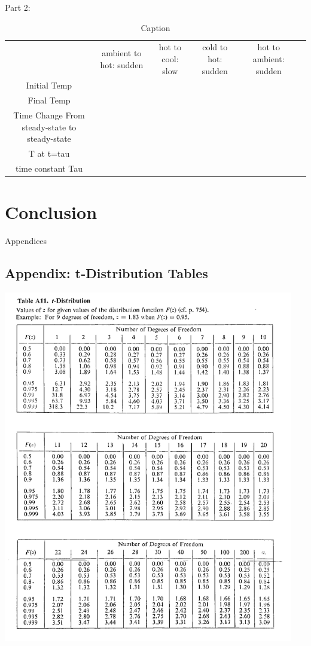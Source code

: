 \documentclass{article}
\begin{document}

Part 2: %

\begin{table}
    \centering
    \begin{tabular}{cccccc}
         &  ambient to hot: sudden&  hot to cool: slow&  cold to hot: sudden&  hot to ambient: sudden& \\
         Initial Temp&  &  &  &  & \\
         Final Temp&  &  &  &  & \\
         Time Change From steady-state to steady-state&  &  &  &  & \\
         T at t=tau&  &  &  &  & \\
         time constant Tau&  &  &  &  & \\
    \end{tabular}
    \caption{Caption}
    \label{tab:my_label}
\end{table}

\section{Conclusion}




\newpage
\thispagestyle{empty}  %
\begin{center}
	\vspace*{\fill}
	{\Huge Appendices}
	\vspace*{\fill}
\end{center}

\newpage
\begin{appendices}
\pagestyle{fancy}
\renewcommand{\thefigure}{A\arabic{figure}}
\setcounter{figure}{0}

\section*{Appendix: t-Distribution Tables}
\hypertarget{1}{\includegraphics[width=0.95\textwidth]{t_distribution_Table_lecture3.png}}
\end{appendices}
\end{document}
